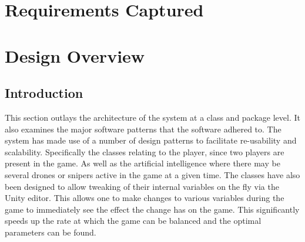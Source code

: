 \documentclass[11pt,a4paper]{article}
\begin{document}
\section{Requirements Captured}

\section{Design Overview}
\label{s:design-overview}
\subsection{Introduction}
This section outlays the architecture of the system at a class and package level. It also examines the major software patterns that the software adhered to. The system has made use of a number of design patterns to facilitate re-usability and scalability. Specifically the classes relating to the player, since two players are present in the game. As well as the artificial intelligence where there may be several drones or snipers active in the game at a given time. The classes have also been designed to allow tweaking of their internal variables on the fly via the Unity editor. This allows one to make changes to various variables during the game to immediately see the effect the change has on the game. This significantly speeds up the rate at which the game can be balanced and the optimal parameters can be found.
\end{document}
